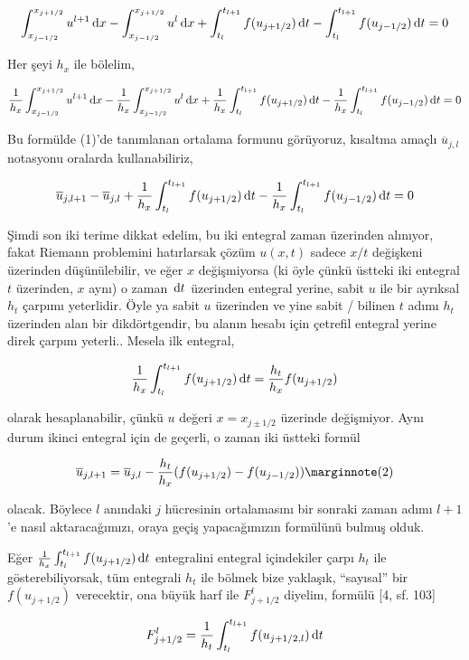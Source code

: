 \documentclass[12pt,fleqn]{article}\usepackage{../../common}
\begin{document}
$$
\int_{x_{j-1/2}}^{x_{j+1/2}} u^{l+1} \,\mathrm{d} x -
\int_{x_{j-1/2}}^{x_{j+1/2}} u^{l} \,\mathrm{d} x  +
\int_{t_l}^{t_{l+1}} f(u_{j+1/2}) \,\mathrm{d} t  -
\int_{t_l}^{t_{l+1}} f(u_{j-1/2}) \,\mathrm{d} t = 0
$$

Her şeyi $h_x$ ile bölelim,

$$
\frac{1}{h_x} \int_{x_{j-1/2}}^{x_{j+1/2}} u^{l+1} \,\mathrm{d} x -
\frac{1}{h_x} \int_{x_{j-1/2}}^{x_{j+1/2}} u^{l} \,\mathrm{d} x  +
\frac{1}{h_x} \int_{t_l}^{t_{l+1}} f(u_{j+1/2}) \,\mathrm{d} t  -
\frac{1}{h_x} \int_{t_l}^{t_{l+1}} f(u_{j-1/2}) \,\mathrm{d} t = 0
$$

Bu formülde (1)'de tanımlanan ortalama formunu görüyoruz, kısaltma amaçlı
$\overline{u}_{j,l}$ notasyonu oralarda kullanabiliriz,

$$
\overline{u}_{j,l+1} - \overline{u}_{j,l} + 
\frac{1}{h_x} \int_{t_l}^{t_{l+1}} f(u_{j+1/2}) \,\mathrm{d} t  -
\frac{1}{h_x} \int_{t_l}^{t_{l+1}} f(u_{j-1/2}) \,\mathrm{d} t = 0
$$

Şimdi son iki terime dikkat edelim, bu iki entegral zaman üzerinden alınıyor,
fakat Riemann problemini hatırlarsak çözüm $u(x,t)$ sadece $x/t$ değişkeni
üzerinden düşünülebilir, ve eğer $x$ değişmiyorsa (ki öyle çünkü üstteki iki
entegral $t$ üzerinden, $x$ aynı) o zaman $\,\mathrm{d} t$ üzerinden entegral yerine,
sabit $u$ ile bir ayrıksal $h_t$ çarpımı yeterlidir. Öyle ya sabit $u$ üzerinden
ve yine sabit / bilinen $t$ adımı $h_t$ üzerinden alan bir dikdörtgendir, bu
alanın hesabı için çetrefil entegral yerine direk çarpım yeterli.. Mesela ilk
entegral,

$$
\frac{1}{h_x} \int_{t_l}^{t_{l+1}} f(u_{j+1/2}) \,\mathrm{d} t =
\frac{h_t}{h_x} f(u_{j+1/2})
$$

olarak hesaplanabilir, çünkü $u$ değeri $x = x_{j \pm 1/2}$ üzerinde değişmiyor.
Aynı durum ikinci entegral için de geçerli, o zaman iki üstteki formül

$$
\overline{u}_{j,l+1} = \overline{u}_{j,l} -
\frac{h_t}{h_x} ( f(u_{j+1/2}) - f(u_{j-1/2}) )
\mlabel{2}
$$

olacak. Böylece $l$ anındaki $j$ hücresinin ortalamasını bir sonraki zaman adımı
$l+1$'e nasıl aktaracağımızı, oraya geçiş yapacağımızın formülünü bulmuş olduk.

Eğer $\frac{1}{h_x} \int_{t_l}^{t_{l+1}} f(u_{j+1/2}) \,\mathrm{d} t$ entegralini
entegral içindekiler çarpı $h_t$ ile gösterebiliyorsak, tüm
entegrali $h_t$ ile bölmek bize yaklaşık, ``sayısal'' bir $f(u_{j+1/2})$
verecektir, ona büyük harf ile $F_{j+1/2}^l$ diyelim, formülü [4, sf. 103]

$$
F_{j+1/2}^l = \frac{1}{h_t} \int_{t_l}^{t_{l+1}} f(u_{j+1/2,l}) \,\mathrm{d} t
$$
\end{document}
